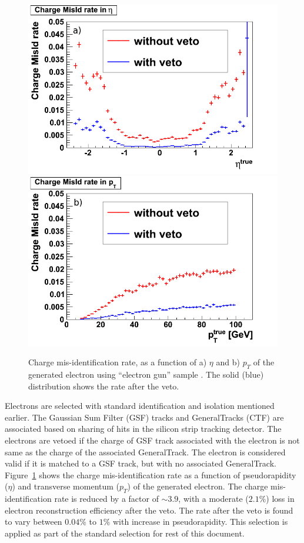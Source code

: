 \begin{figure}[htb]
\begin{center}
\includegraphics[width=0.485\linewidth,height=0.37\linewidth]{figs/ChargeMisIdRateEta.png}
\includegraphics[width=0.485\linewidth,height=0.37\linewidth]{figs/ChargeMisIdRatePt.png}
\caption{Charge mis-identification rate, as a function of a) $\eta$ and b) $p_T$ of the generated
electron using ``electron gun'' sample \label{fig:charge_misid}. The solid (blue) distribution shows
the rate after the veto.}
\end{center}
\end{figure}
Electrons are selected with standard identification and isolation mentioned earlier. The Gaussian Sum Filter (GSF) tracks 
and GeneralTracks (CTF) are associated based on sharing of hits in the silicon strip tracking detector. 
The electrons are vetoed if the charge of GSF track associated with the electron is not same 
as the charge of the associated GeneralTrack. The electron is considered valid if it is matched
to a GSF track, but with no associated GeneralTrack. Figure~\ref{fig:charge_misid} shows the charge mis-identification 
rate as a function of pseudorapidity ($\eta$) and transverse momentum ($p_T$) of the generated electron. The charge 
mis-identification rate is reduced by a factor of $\sim 3.9$, with a moderate ($2.1\%$)  loss in electron reconstruction 
efficiency after the veto. The rate after the veto is found to vary between $0.04\%$ to $1\%$ with increase in 
pseudorapidity. This selection is applied as part of the standard selection for rest of this document.
